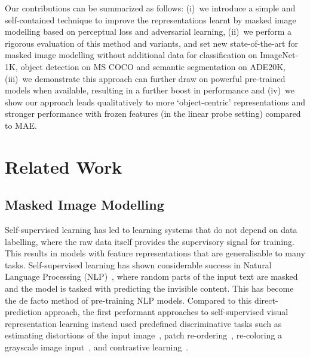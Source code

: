 \documentclass[10pt,twocolumn,letterpaper, cta-author]{article}
\begin{document}
Our contributions can be summarized as follows: (i)~we introduce a simple and self-contained technique to improve the representations learnt by masked image modelling based on perceptual loss and adversarial learning, (ii)~we perform a rigorous evaluation of this method and variants, and set new state-of-the-art for masked image modelling without additional data for classification on ImageNet-1K, object detection on MS COCO and semantic segmentation on ADE20K, (iii)~we demonstrate this approach can further draw on powerful pre-trained models when available, resulting in a further boost in performance and (iv)~we show our approach leads qualitatively to more `object-centric' representations and stronger performance with frozen features (in the linear probe setting) compared to MAE.
\section{Related Work}
\label{sec:related_work}

\subsection{Masked Image Modelling}

Self-supervised learning has led to learning systems that do not depend on data labelling, where the raw data itself provides the supervisory signal for training. This results in models with feature representations that are generalisable to many tasks. Self-supervised learning has shown considerable success in Natural Language Processing (NLP)~\cite{NIPS2017_3f5ee243, NEURIPS2020_1457c0d6, liu2019roberta}, where random parts of the input text are masked and the model is tasked with predicting the invisible content. This has become the de facto method of pre-training NLP models. Compared to this direct-prediction approach, the first performant approaches to self-supervised visual representation learning instead used predefined discriminative tasks such as estimating distortions of the input image~\cite{NIPS2014_07563a3f, Gidaris2018UnsupervisedRL}, patch re-ordering~\cite{7410524, 10.1007/978-3-319-46466-4_5}, re-coloring a grayscale image input~\cite{zhang2016colorful}, and contrastive learning~\cite{Oord2018RepresentationLW, pmlr-v119-chen20j}.
\end{document}
